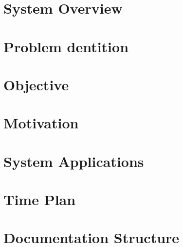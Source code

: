 \section{System Overview}
\section{Problem dentition}
\section{Objective}
\section{Motivation}
\section{System Applications}
\section{Time Plan}
\section{Documentation Structure}